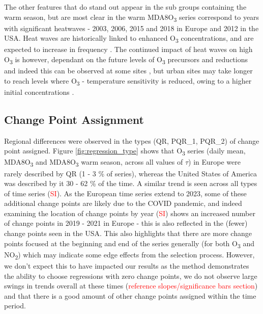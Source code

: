 \documentclass[journal abbreviation, manuscript]{copernicus}
\begin{document}
The other features that do stand out appear in the sub groups containing the warm season, but are most clear in the warm MDA8O\textsubscript{3} series correspond to years with significant heatwaves - 2003, 2006, 2015 and 2018 in Europe and 2012 in the USA. Heat waves are historically linked to enhanced O\textsubscript{3} concentrations, and are expected to increase in frequency \citep{Schär2004, Russo_2015, https://doi.org/10.1002/2016GL068432, Otero_2016, GOULDSBROUGH2022118975}. The continued impact of heat waves on high O\textsubscript{3} is however, dependant on the future levels of O\textsubscript{3} precursors and reductions and indeed this can be observed at some sites \citep{Meehl_2018, OTERO2021118334, acp-25-2725-2025, acp-25-5101-2025}, but urban sites may take longer to reach levels where O\textsubscript{3} - temperature sensitivity is reduced, owing to a higher initial concentrations \citep{VazquezSantiago2024}.


\subsection{Change Point Assignment} \label{sect:new_mda8_piecewise_types}

Regional differences were observed in the types (QR, PQR\_1, PQR\_2) of change point assigned. Figure \ref{fig:regression_type} shows that O\textsubscript{3} series (daily mean, MDA8O\textsubscript{3} and MDA8O\textsubscript{3} warm season, across all values of $\tau$) in Europe were rarely described by QR (1 - 3 \% of series), whereas the United States of America was described by it 30 - 62 \% of the time. A similar trend is seen across all types of time series (\textcolor{red}{SI}). As the European time series extend to 2023, some of these additional change points are likely due to the COVID pandemic, and indeed examining the location of change points by year (\textcolor{red}{SI}) shows an increased number of change points in 2019 - 2021 in Europe - this is also reflected in the (fewer) change points seen in the USA. This also highlights that there are more change points focused at the beginning and end of the series generally (for both O\textsubscript{3} and NO\textsubscript{2}) which may indicate some edge effects from the selection process. However, we don't expect this to have impacted our results as the method demonstrates the ability to choose regressions with zero change points, we do not observe large swings in trends overall at these times (\textcolor{red}{reference slopes/significance bars section}) and that there is a good amount of other change points assigned within the time period.
 
\end{document}
